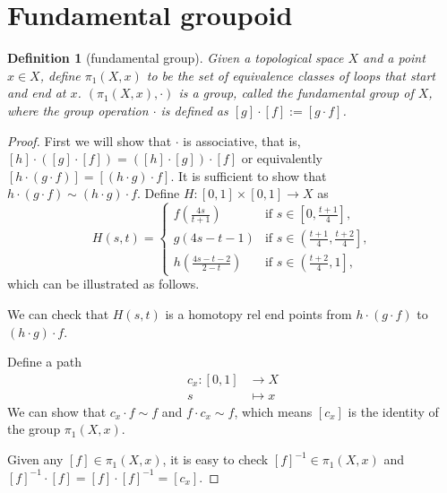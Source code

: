 \documentclass{report}
\newtheorem{definition}{Definition}[section]
\theoremstyle{nonumberplain}
\newtheorem{proof}{Proof.}
\begin{document}
\section{Fundamental groupoid}
\begin{definition}[fundamental group]
	Given a topological space $X$ and a point $x\in X$, define $\pi_1(X, x)$ to be the set of equivalence classes of loops that start and end at $x$. $(\pi_1(X, x),\cdot)$ is a group, called the fundamental group of $X$, where the group operation $\cdot$ is defined as $[g]\cdot[f]:=[g\cdot f]$.
\end{definition}
\begin{proof}
	First we will show that $\cdot$ is associative, that is, $[h]\cdot\left([g]\cdot[f]\right)=\left([h]\cdot[g]\right)\cdot[f]$ or equivalently $[h\cdot(g\cdot f)]=[(h\cdot g)\cdot f]$. It is sufficient to show that $h\cdot(g\cdot f)\sim (h\cdot g)\cdot f$. Define $H:[0,1]\times[0,1]\to X$ as
	\[
		H(s,t)=\begin{cases}
			f\left(\frac{4s}{t+1}\right)&\text{if }s\in\left[0,\frac{t+1}{4}\right],\\
			g(4s-t-1)&\text{if }s\in\left(\left.\frac{t+1}{4},\frac{t+2}{4}\right]\right.,\\
			h\left(\frac{4s-t-2}{2-t}\right)&\text{if }s\in\left(\left.\frac{t+2}{4},1\right]\right.,
		\end{cases}
	\]
	which can be illustrated as follows.
	\begin{center}
	\end{center}
	We can check that $H(s,t)$ is a homotopy rel end points from $h\cdot(g\cdot f)$ to $(h\cdot g)\cdot f$.

	Define a path
	\begin{align*}
		c_x:[0,1] &\longrightarrow X\\
		s &\longmapsto x
	\end{align*}
	We can show that $c_x\cdot f\sim f$ and $f\cdot c_x\sim f$, which means $[c_x]$ is the identity of the group $\pi_1(X,x)$. 

	Given any $[f]\in \pi_1(X,x)$, it is easy to check $\left[f\right]^{-1}\in \pi_1(X,x)$ and $[f]^{-1}\cdot[f]=[f]\cdot[f]^{-1}=[c_x]$.
\end{proof}
\end{document}
